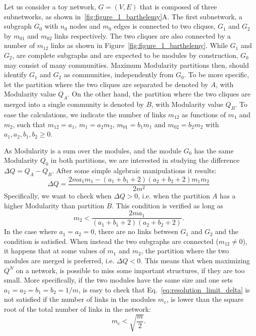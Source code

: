 Let us consider a toy network, $G=(V,E)$ that is composed of three subnetworks, as shown in~\ref{fig:figure_1_barthelemy}A.
The first subnetwork, a subgraph $G_0$ with $n_0$ nodes and $m_0$ edges is connected to two cliques, $G_1$ and $G_2$ by $m_{01}$ and $m_{02}$ links respectively. The two cliques are also connected by a number of $m_{12}$ links as shown in Figure~\ref{fig:figure_1_barthelemy}.
While $G_1$ and $G_2$, are complete subgraphs and are expected to be modules by construction, $G_0$ may consist of many communities. Maximum Modularity partitions then, should identify $G_1$ and $G_2$ as communities, independently from $G_0$.
To be more specific, let the partition where the two cliques are separated be denoted by $A$, with Modularity value $Q_A$. On the other hand, the partition where the two cliques are merged into a single community is denoted by $B$, with Modularity value $Q_B$.
To ease the calculations, we indicate the number of links $m_{12}$ as functions of $m_1$ and $m_2$, such that $m_{12}=a_{1}$, $m_1=a_2 m_2$, $m_{01}=b_1 m_1$ and $m_{02}=b_2 m_2$ with $a_1,a_2,b_1,b_2 \geq 0$.

As Modularity is a sum over the modules, and the module $G_0$ has the same Modularity $Q_0$ in both partitions, we are interested in studying the difference $\Delta Q = Q_{A} - Q_{B}$. After some simple algebraic manipulations it results:
\begin{equation} \label{eq:resolution_limit_delta}
\Delta Q = \frac{2 m a_1 m_1 - (a_1+b_1+2)(a_2+b_2+2)m_1 m_2}{2m^2}
\end{equation}
Specifically, we want to check when $\Delta Q > 0$, i.e. when the partition $A$ has a higher Modularity than partition $B$. This condition is verified as long as
\begin{equation}
m_2 < \frac{2m a_1}{(a_1+b_1+2)(a_2+b_2+2)}.
\end{equation}
In the case where $a_1=a_2=0$, there are no links between $G_1$ and $G_2$ and the condition is satisfied. When instead the two subgraphs are connected ($m_{12} \neq 0$), it happens that at some values of $m_1$ and $m_2$, the partition where the two modules are merged is preferred, i.e. $\Delta Q <0$. This means that when maximizing $Q^N$ on a network, is possible to miss some important structures, if they are too small.
More specifically, if the two modules have the same size and one sets $a_1=a_2=b_1=b_2=1/m$, is easy to check that Eq.~\ref{eq:resolution_limit_delta} is not satisfied if the number of links in the modules $m_c$, is lower than the square root of the total number of links in the network:
\begin{equation}
m_c < \sqrt{\frac{m}{2}}.
\end{equation}

